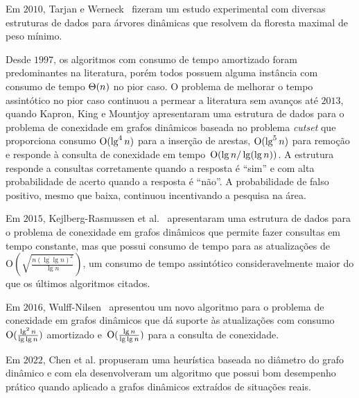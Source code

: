 
Em $2010$, Tarjan e Werneck~\cite{tarjanWerneck2010} fizeram um estudo experimental com diversas estruturas de dados para árvores dinâmicas que resolvem  da floresta maximal de peso mínimo.


Desde $1997$, os algoritmos com consumo de tempo amortizado foram predominantes na literatura, porém todos possuem alguma instância com consumo de tempo $\Theta(n)$ no pior caso.
O problema de melhorar o tempo assintótico no pior caso continuou a permear a literatura sem avanços até $2013$, quando Kapron, King e Mountjoy \cite{bruceM} apresentaram uma estrutura de dados para o problema de conexidade em grafos dinâmicos baseada no problema \textit{cutset} que proporciona consumo $\mathrm{O}(\lg^4 n)$ para a inserção de arestas, $\mathrm{O}(\lg^5 n)$ para remoção e responde à consulta de conexidade em tempo~$\mathrm{O}(\lg n / \lg(\lg n))$.
A estrutura responde a consultas corretamente quando a resposta é “sim” e com alta probabilidade de acerto quando a resposta é “não”. A probabilidade de falso positivo, mesmo que baixa, continuou incentivando a pesquisa na área. 

Em $2015$, Kejlberg-Rasmussen et al.~\cite{kejlbergrasmussen_et_al} apresentaram uma estrutura de dados para o problema de conexidade em grafos dinâmicos que permite fazer consultas em tempo constante, mas que possui consumo de tempo para as atualizações de~$\mathrm{O}\!\left(\sqrt{\frac{n\left(\lg \lg n\right)^2}{\lg n}}\right)$, um consumo de tempo assintótico consideravelmente maior do que os últimos algoritmos citados.

Em $2016$, Wulff-Nilsen~\cite{Wulff-Nilsen2016} apresentou um novo algoritmo para o problema de conexidade em grafos dinâmicos que dá suporte às atualizações com consumo~$\mathrm{O}(\frac{\lg^2 n}{\lg \lg n})$ amortizado e~$\mathrm{O}(\frac{\lg n}{\lg \lg n})$ para a consulta de conexidade.

Em $2022$, Chen et al. \cite{QC22} propuseram uma heurística baseada no diâmetro do grafo dinâmico e com ela desenvolveram um algoritmo que possui bom desempenho prático quando aplicado a grafos dinâmicos extraídos de situações reais.

